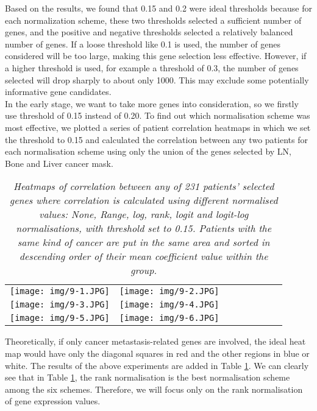 \documentclass[12pt,a4paper]{report}
\begin{document}
Based on the results, we found that 0.15 and 0.2 were ideal thresholds because for each normalization scheme, these two thresholds selected a sufficient number of genes, and the positive and negative thresholds selected a relatively balanced number of genes. If a loose threshold like 0.1 is used, the number of genes considered will be too large, making this gene selection less effective. However, if a higher threshold is used, for example a threshold of 0.3, the number of genes selected will drop sharply to about only 1000. This may exclude some potentially informative gene candidates.\\

In the early stage, we want to take more genes into consideration, so we firstly use threshold of 0.15 instead of 0.20. To find out which normalisation scheme was most effective, we plotted a series of patient correlation heatmaps in which we set the threshold to 0.15 and calculated the correlation between any two patients for each normalisation scheme using only the union of the genes selected by LN, Bone and Liver cancer mask. \\

\begin{table}[]
\begin{tabular}{llllllll}
\cline{1-2}
\multicolumn{1}{|l|}{\texttt{[image: img/9-1.JPG]}} & \multicolumn{1}{l|}{\texttt{[image: img/9-2.JPG]}} &  &  &  &  &  &  \\ \cline{1-2}
\multicolumn{1}{|l|}{\texttt{[image: img/9-3.JPG]}} & \multicolumn{1}{l|}{\texttt{[image: img/9-4.JPG]}} &  &  &  &  &  &  \\ \cline{1-2}
\multicolumn{1}{|l|}{\texttt{[image: img/9-5.JPG]}} & \multicolumn{1}{l|}{\texttt{[image: img/9-6.JPG]}} &  &  &  &  &  &  \\ \cline{1-2}
\end{tabular}
\caption{\textit{Heatmaps of correlation between any of 231 patients’ selected genes where correlation is calculated using different normalised values: None, Range, log, rank, logit and logit-log normalisations, with threshold set to 0.15. Patients with the same kind of cancer are put in the same area and sorted in descending order of their mean coefficient value within the group.}}
\label{tab:hms}
\end{table}

Theoretically, if only cancer metastasis-related genes are involved, the ideal heat map would have only the diagonal squares in red and the other regions in blue or white. The results of the above experiments are added in Table \ref{tab:hms}. We can clearly see that in Table \ref{tab:hms}, the rank normalisation is the best normalisation scheme among the six schemes. Therefore, we will focus only on the rank normalisation of gene expression values.
\end{document}
